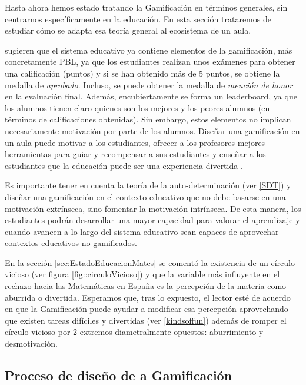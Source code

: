 Hasta ahora hemos estado tratando la Gamificación en términos generales, sin centrarnos específicamente en la educación. 
%
En esta sección trataremos de estudiar cómo se adapta esa teoría general al ecosistema de un aula.



 \cite{lee2011gamification} sugieren que el sistema educativo ya contiene elementos de la gamificación, más concretamente \gls{PBL}, ya que los estudiantes realizan unos exámenes para obtener una calificación (puntos) y si se han obtenido más de 5 puntos, se obtiene la medalla de \textit{aprobado}.
%
Incluso, se puede obtener la medalla de \textit{mención de honor} en la evaluación final.
%
Además, encubiertamente se forma un leaderboard, ya que los alumnos tienen claro quienes son los mejores y los peores alumnos (en términos de calificaciones obtenidas).
%
Sin embargo, estos elementos no implican necesariamente motivación por parte de los alumnos.
%
Diseñar una gamificación en un aula puede motivar a los estudiantes, ofrecer a los profesores mejores herramientas para guiar y recompensar a sus estudiantes y enseñar a los estudiantes que la educación puede ser una experiencia divertida  \cite{lee2011gamification}.

Es importante tener en cuenta la teoría de la auto-determinación (ver \ref{SDT}) y diseñar una gamificación en el contexto educativo que no debe basarse en una motivación extrínseca, sino fomentar la motivación intrínseca. 
%
De esta manera, los estudiantes podrán desarrollar una mayor capacidad para valorar el aprendizaje y cuando avancen a lo largo del sistema educativo sean capaces de aprovechar contextos educativos no gamificados. 


En la sección \ref{sec:EstadoEducacionMates} se comentó la existencia de un círculo vicioso (ver figura \ref{fig::circuloVicioso}) y que la variable más influyente en el rechazo hacia las Matemáticas en España es la percepción de la materia como aburrida o divertida.
%
Esperamos que, tras lo expuesto, el lector esté de acuerdo en que la Gamificación puede ayudar a modificar esa percepción aprovechando que existen tareas difíciles y divertidas (ver \ref{kindsoffun}) además de romper el círculo vicioso por 2 extremos diametralmente opuestos: aburrimiento y desmotivación.



\subsection{Proceso de diseño de a Gamificación}

